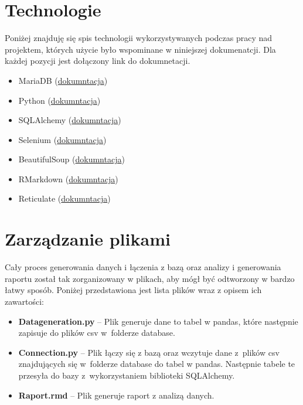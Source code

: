 \documentclass{article}
\begin{document}
	\section{Technologie}
	Poniżej znajduję się spis technologii wykorzystywanych podczas pracy nad projektem, których użycie było wspominane w niniejszej dokumenatcji. Dla każdej pozycji jest dołączony link do dokumnetacji.
	\begin{itemize}
		\setlength{\itemsep}{-2pt}
		\item MariaDB (\href{https://mariadb.com/kb/en/}{dokumntacja})
		\item Python (\href{https://www.python.org/doc/}{dokumntacja})
		\item SQLAlchemy (\href{https://www.sqlalchemy.org/}{dokumntacja})
		\item Selenium (\href{https://selenium-python.readthedocs.io/?fbclid=IwAR3mhY42CU1bHhruIm0kzWo9hTZjRoGbooMU2BGEkrFJWPC9i9e93pRitqY}{dokumntacja})
		\item BeautifulSoup (\href{https://beautiful-soup-4.readthedocs.io/en/latest/}{dokumntacja})
		\item RMarkdown (\href{https://www.rdocumentation.org/packages/rmarkdown/versions/2.22}{dokumntacja})
		\item Reticulate (\href{https://rstudio.github.io/reticulate/}{dokumntacja})
	\end{itemize}
	
	
	
	\section{Zarządzanie plikami}
	Cały proces generowania danych i łączenia z bazą oraz analizy i generowania raportu został tak zorganizowany w plikach, aby mógł być odtworzony w bardzo łatwy sposób. Poniżej przedstawiona jest lista plików wraz z opisem ich zawartości:
	\begin{itemize}
		\setlength{\itemsep}{-2pt}
		\item \textbf{Data\textunderscore generation.py} – Plik generuje dane to tabel w pandas, które następnie zapisuje do plików csv w~folderze database.
		\item \textbf{Connection.py} – Plik łączy się z bazą oraz wczytuje dane z~plików csv znajdujących się w~folderze database do tabel w pandas.
		Następnie tabele te przesyła do bazy z~wykorzystaniem biblioteki SQLAlchemy.
		\item \textbf{Raport.rmd} – Plik generuje raport z analizą danych.	
	\end{itemize}
	
\end{document}
